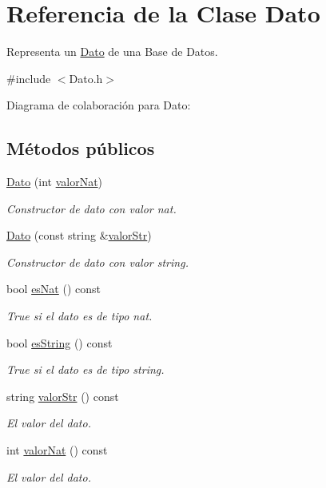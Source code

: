 \hypertarget{classDato}{\section{Referencia de la Clase Dato}
\label{classDato}
}


Representa un \hyperlink{classDato}{Dato} de una Base de Datos.  




{\ttfamily \#include $<$Dato.\+h$>$}



Diagrama de colaboración para Dato\+:
\subsection*{Métodos públicos}
\begin{DoxyCompactItemize}
\item 
\hyperlink{classDato_aeb115751623b17f5cc61199c45dd6fb4}{Dato} (int \hyperlink{classDato_a417fa8d0766c8ac1221c553b0f31ba93}{valor\+Nat})
\begin{DoxyCompactList}\small\item\em Constructor de dato con valor nat. \end{DoxyCompactList}\item 
\hyperlink{classDato_a3b8e8b3472eee6374487378e865e3428}{Dato} (const string \&\hyperlink{classDato_ac1ece791ad4cc21764a89ffac254add8}{valor\+Str})
\begin{DoxyCompactList}\small\item\em Constructor de dato con valor string. \end{DoxyCompactList}\item 
bool \hyperlink{classDato_a815f643cd190da9ddf25e1c91d0eb7fa}{es\+Nat} () const 
\begin{DoxyCompactList}\small\item\em True si el dato es de tipo nat. \end{DoxyCompactList}\item 
bool \hyperlink{classDato_a25bc3327023f6d84729d64d61800937b}{es\+String} () const 
\begin{DoxyCompactList}\small\item\em True si el dato es de tipo string. \end{DoxyCompactList}\item 
string \hyperlink{classDato_ac1ece791ad4cc21764a89ffac254add8}{valor\+Str} () const 
\begin{DoxyCompactList}\small\item\em El valor del dato. \end{DoxyCompactList}\item 
int \hyperlink{classDato_a417fa8d0766c8ac1221c553b0f31ba93}{valor\+Nat} () const 
\begin{DoxyCompactList}\small\item\em El valor del dato. \end{DoxyCompactList}\end{DoxyCompactItemize}

